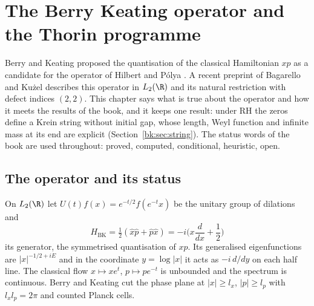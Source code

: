 \chapter{The Berry Keating operator and the Thorin programme}\label{ch:bk}

Berry and Keating proposed the quantisation of the classical Hamiltonian $xp$ as a candidate for the operator of Hilbert and P\'olya \cite{BerryKeating99}. A recent preprint of Bagarello and Ku\.{z}el \cite{BagarelloKuzel26} describes this operator in $L_2(\R)$ and its natural restriction with defect indices $(2,2)$. This chapter says what is true about the operator and how it meets the results of the book, and it keeps one result: under RH the zeros define a Krein string without initial gap, whose length, Weyl function and infinite mass at its end are explicit (Section~\ref{bk:sec:string}). The status words of the book are used throughout: proved, computed, conditional, heuristic, open.

\section{The operator and its status}\label{bk:sec:op}

On $L_2(\R)$ let $U(t)f(x)=e^{-t/2}f(e^{-t}x)$ be the unitary group of dilations and
\begin{equation}\label{bk:eq:H}
H_{\mathrm{BK}}=\tfrac12(\hat x\hat p+\hat p\hat x)=-i\Big(x\frac{d}{dx}+\frac12\Big)
\end{equation}
its generator, the symmetrised quantisation of $xp$. Its generalised eigenfunctions are $|x|^{-1/2+iE}$ and in the coordinate $y=\log|x|$ it acts as $-i\,d/dy$ on each half line. The classical flow $x\mapsto xe^t$, $p\mapsto pe^{-t}$ is unbounded and the spectrum is continuous. Berry and Keating cut the phase plane at $|x|\ge l_x$, $|p|\ge l_p$ with $l_xl_p=2\pi$ and counted Planck cells.

